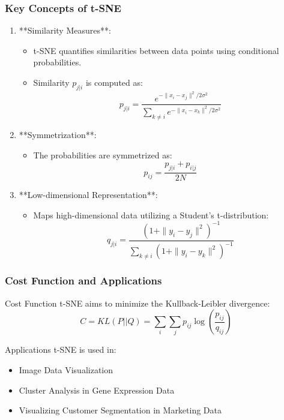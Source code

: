 \documentclass[aspectratio=169]{beamer}
\begin{document}
\begin{frame}[fragile]
    \frametitle{Key Concepts of t-SNE}
    \begin{enumerate}
        \item **Similarity Measures**:
        \begin{itemize}
            \item t-SNE quantifies similarities between data points using conditional probabilities.
            \item Similarity \( p_{j|i} \) is computed as:
            \begin{equation}
                p_{j|i} = \frac{e^{-\|x_i - x_j\|^2 / 2\sigma^2}}{\sum_{k \neq i} e^{-\|x_i - x_k\|^2 / 2\sigma^2}}
            \end{equation}
        \end{itemize}

        \item **Symmetrization**:
        \begin{itemize}
            \item The probabilities are symmetrized as:
            \begin{equation}
                p_{ij} = \frac{p_{j|i} + p_{i|j}}{2N}
            \end{equation}
        \end{itemize}
        
        \item **Low-dimensional Representation**:
        \begin{itemize}
            \item Maps high-dimensional data utilizing a Student's t-distribution:
            \begin{equation}
                q_{j|i} = \frac{(1 + \|y_i - y_j\|^2)^{-1}}{\sum_{k \neq i}(1 + \|y_i - y_k\|^2)^{-1}}
            \end{equation}
        \end{itemize}
    \end{enumerate}
\end{frame}

\begin{frame}[fragile]
    \frametitle{Cost Function and Applications}
    \begin{block}{Cost Function}
        t-SNE aims to minimize the Kullback-Leibler divergence:
        \begin{equation}
            C = KL(P || Q) = \sum_{i} \sum_{j} p_{ij} \log\left(\frac{p_{ij}}{q_{ij}}\right)
        \end{equation}
    \end{block}

    \begin{block}{Applications}
        t-SNE is used in:
        \begin{itemize}
            \item Image Data Visualization
            \item Cluster Analysis in Gene Expression Data
            \item Visualizing Customer Segmentation in Marketing Data
        \end{itemize}
    \end{block}
\end{frame}
\end{document}
